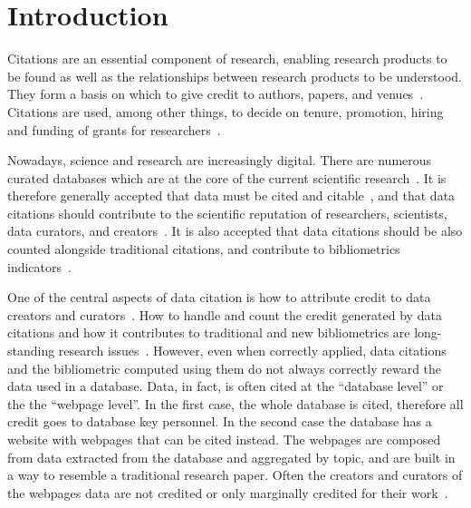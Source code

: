 
\section{Introduction}

Citations are an essential component of research, enabling research products to be found as well as the relationships between research products to be understood. 
They form a basis on which to give credit to authors, papers, and venues~\citep{ZouP16}.
Citations are used, among other things, to decide on tenure, promotion, hiring and funding of grants for researchers~\citep{meho2007impact, Cronin01, Hartley17, Kosten16}.

Nowadays, science and research are increasingly digital. There are numerous curated databases which are at the core of the current scientific research~\citep{bunemann2016citation}.
It is therefore generally accepted that data must be cited and citable~\citep{LawrenceEtAl2011,CallaghanDPTCKABBLLMHSWW12}, and that data citations should contribute to the scientific reputation of researchers, scientists, data curators, and creators~\citep{AltmanEtAl2015,Spengler2012}.
It is also accepted that data citations should be also counted alongside traditional citations, and contribute to bibliometrics indicators~\citep{Belter2014,Peters2016}.

One of the central aspects of data citation is how to attribute credit to data creators and curators~\citep{buneman2019summ}. 
How to handle and count the credit generated by data citations and how it contributes to traditional and new bibliometrics are long-standing research issues~\citep{garfield1999journal,Borgman2016}.
However, even when correctly applied, data citations and the bibliometric computed using them do not always correctly reward the data used in a database.
Data, in fact, is often cited at the ``database level'' or the the ``webpage level''. 
In the first case, the whole database is cited, therefore all credit goes to database key personnel.
In the second case the database has a website with webpages that can be cited instead. 
The webpages are composed from data extracted from the database and aggregated by topic, and are built in a way to resemble a traditional research paper.
Often the creators and curators of the webpages data are not credited or only marginally credited for their work~\citep{AlawiniDSTW17}.

